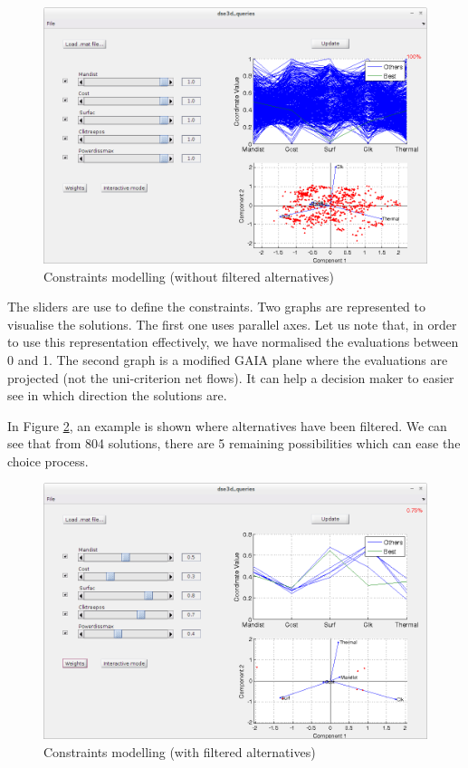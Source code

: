 \begin{figure}[h!]
\begin{center}
\includegraphics[width=\linewidth]{dseconstraints}
\end{center}
\caption{Constraints modelling (without filtered alternatives)}
\label{fig:dse1}
\end{figure}

The sliders are use to define the constraints. Two graphs are represented to visualise the solutions. The first one uses parallel axes. Let us note that, in order to use this representation effectively, we have normalised the evaluations between 0 and 1. The second graph is a modified GAIA plane where the evaluations are projected (not the uni-criterion net flows). It can help a decision maker to easier see in which direction the solutions are.

In Figure \ref{fig:dse2}, an example is shown where alternatives have been filtered. We can see that from 804 solutions, there are 5 remaining possibilities which can ease the choice process.

\begin{figure}[h!]
\begin{center}
\includegraphics[width=\linewidth]{dseconstraints2}
\end{center}
\caption{Constraints modelling (with filtered alternatives)}
\label{fig:dse2}
\end{figure}

